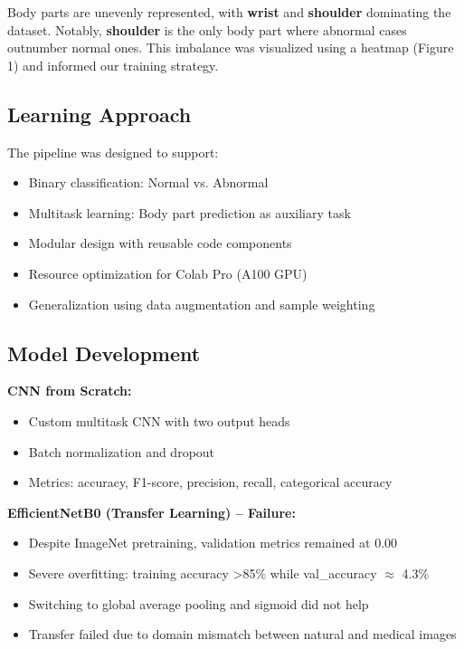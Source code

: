 \documentclass[11pt]{article}
\begin{document}
Body parts are unevenly represented, with \textbf{wrist} and \textbf{shoulder} dominating the dataset. Notably, \textbf{shoulder} is the only body part where abnormal cases outnumber normal ones. This imbalance was visualized using a heatmap (Figure 1) and informed our training strategy.

\subsection*{Learning Approach}
The pipeline was designed to support:
\begin{itemize}
    \item Binary classification: Normal vs. Abnormal
    \item Multitask learning: Body part prediction as auxiliary task
    \item Modular design with reusable code components
    \item Resource optimization for Colab Pro (A100 GPU)
    \item Generalization using data augmentation and sample weighting
\end{itemize}

\subsection*{Model Development}

\textbf{CNN from Scratch:}
\begin{itemize}
    \item Custom multitask CNN with two output heads
    \item Batch normalization and dropout
    \item Metrics: accuracy, F1-score, precision, recall, categorical accuracy
\end{itemize}

\textbf{EfficientNetB0 (Transfer Learning) -- Failure:}
\begin{itemize}
    \item Despite ImageNet pretraining, validation metrics remained at 0.00
    \item Severe overfitting: training accuracy >85\% while val\_accuracy $\approx$ 4.3\%
    \item Switching to global average pooling and sigmoid did not help
    \item Transfer failed due to domain mismatch between natural and medical images
\end{itemize}
\end{document}
